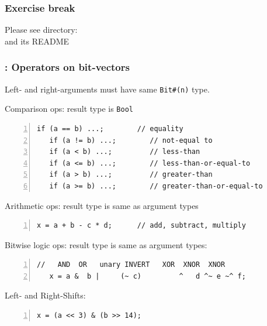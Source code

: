 
\begin{frame}
\frametitle{\EmojiExercise \hmm Exercise break}

Please see directory:  \\
and its README

\end{frame}


\begin{frame}[fragile]
\frametitle{{\BSV}: Operators on bit-vectors}

\footnotesize

Left- and right-arguments must have same \verb|Bit#(n)| type.

\vspace{1ex}

Comparison ops: result type is {\tt Bool}
\begin{Verbatim}[frame=single, numbers=left]
   if (a == b) ...;        // equality
   if (a != b) ...;        // not-equal to
   if (a < b) ...;         // less-than
   if (a <= b) ...;        // less-than-or-equal-to
   if (a > b) ...;         // greater-than
   if (a >= b) ...;        // greater-than-or-equal-to
\end{Verbatim}

Arithmetic ops: result type is same as argument types
\begin{Verbatim}[frame=single, numbers=left]
   x = a + b - c * d;      // add, subtract, multiply
\end{Verbatim}

Bitwise logic ops: result type is same as argument types:
\begin{Verbatim}[frame=single, numbers=left]
   //   AND  OR   unary INVERT   XOR  XNOR  XNOR
   x = a &  b |     (~ c)         ^   d ^~ e ~^ f;
\end{Verbatim}

Left- and Right-Shifts:
\begin{Verbatim}[frame=single, numbers=left]
   x = (a << 3) & (b >> 14);
\end{Verbatim}

\end{frame}


